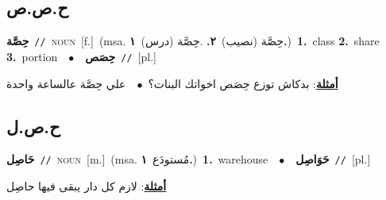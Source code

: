 \documentclass[10pt,a4paper,twoside]{article} %
\begin{document}
\begin{multicols}{2}
\vspace{-3mm}
\subsection*{\color{blue}\foreignlanguage{arabic}{ح.ص.ص}\color{blue}{}} 

{\setlength\topsep{0pt}\textbf{\foreignlanguage{arabic}{حِصَّة}}\ {\color{gray}\texttt{//}\color{black}}\ \textsc{noun}\ [f.]\ \color{gray}(msa. \foreignlanguage{arabic}{حِصَّة (نصيب)}~\foreignlanguage{arabic}{\textbf{٢.}}  .\foreignlanguage{arabic}{حِصَّة (درس)}~\foreignlanguage{arabic}{\textbf{١.}})\color{black}\ \textbf{1.}~class  \textbf{2.}~share  \textbf{3.}~portion\ \ $\bullet$\ \ \setlength\topsep{0pt}\textbf{\foreignlanguage{arabic}{حِصَص}}\ {\color{gray}\texttt{//}\color{black}}\ [pl.]\  \begin{flushright}\color{gray}\foreignlanguage{arabic}{\textbf{\underline{\foreignlanguage{arabic}{أمثلة}}}: بدكاش توزع حِصَص اخواتك البنات؟\ $\bullet$\ \  علي حِصَّة عالساعة واحدة}\end{flushright}\color{black}} \vspace{2mm}

\vspace{-3mm}
\subsection*{\color{blue}\foreignlanguage{arabic}{ح.ص.ل}\color{blue}{}} 

{\setlength\topsep{0pt}\textbf{\foreignlanguage{arabic}{حَاصِل}}\ {\color{gray}\texttt{//}\color{black}}\ \textsc{noun}\ [m.]\ \color{gray}(msa. \foreignlanguage{arabic}{مُستودَع}~\foreignlanguage{arabic}{\textbf{١.}})\color{black}\ \textbf{1.}~warehouse\ \ $\bullet$\ \ \setlength\topsep{0pt}\textbf{\foreignlanguage{arabic}{حَوَاصِل}}\ {\color{gray}\texttt{//}\color{black}}\ [pl.]\  \begin{flushright}\color{gray}\foreignlanguage{arabic}{\textbf{\underline{\foreignlanguage{arabic}{أمثلة}}}: لازم كل دار يبقى فيها حاصِل}\end{flushright}\color{black}} \vspace{2mm}


\end{multicols}
\end{document}
